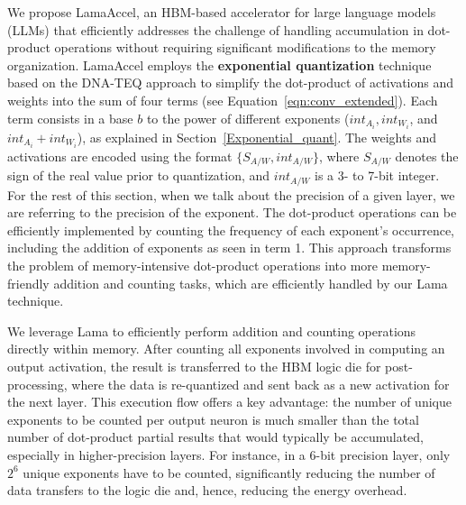 We propose LamaAccel, an HBM-based accelerator for large language models (LLMs) that efficiently addresses the challenge of handling accumulation in dot-product operations without requiring significant modifications to the memory organization. LamaAccel employs the \textbf{exponential quantization} technique based on the DNA-TEQ approach to simplify the dot-product of activations and weights into the sum of four terms (see Equation~\ref{eqn:conv_extended}). Each term consists in a base $b$ to the power of different exponents ($int_{A_{i}}, int_{W_{i}}$, and $int_{A_{i}} + int_{W_{i}}$), as explained in Section~\ref{Exponential_quant}. The weights and activations are encoded using the format $\{S_{A/W}, int_{A/W}\}$, where $S_{A/W}$ denotes the sign of the real value prior to quantization, and $int_{A/W}$ is a 3- to 7-bit integer. For the rest of this section, when we talk about the precision of a given layer, we are referring to the precision of the exponent. The dot-product operations can be efficiently implemented by counting the frequency of each exponent's occurrence, including the addition of exponents as seen in term 1. This approach transforms the problem of memory-intensive dot-product operations into more memory-friendly addition and counting tasks, which are efficiently handled by our Lama technique.


We leverage Lama to efficiently perform addition and counting operations directly within memory. After counting all exponents involved in computing an output activation, the result is transferred to the HBM logic die for post-processing, where the data is re-quantized and sent back as a new activation for the next layer. This execution flow offers a key advantage: the number of unique exponents to be counted per output neuron is much smaller than the total number of dot-product partial results that would typically be accumulated, especially in higher-precision layers. For instance, in a 6-bit precision layer, only $2^6$ unique exponents have to be counted, significantly reducing the number of data transfers to the logic die and, hence, reducing the energy overhead.

